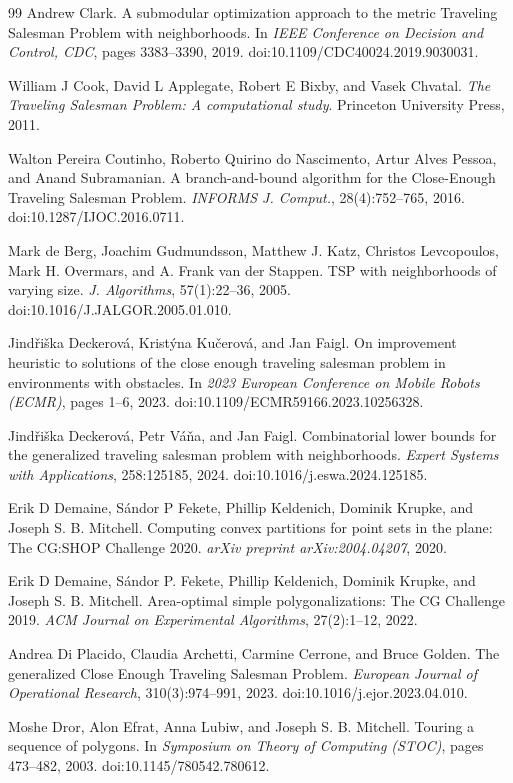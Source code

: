 \documentclass[11pt,a4paper]{article}
\theoremstyle{plain}
\begin{document}
\begin{thebibliography}{99}
 Andrew Clark. A submodular optimization approach to the metric Traveling Salesman Problem with neighborhoods. In \emph{IEEE Conference on Decision and Control, CDC}, pages 3383--3390, 2019. doi:10.1109/CDC40024.2019.9030031.

 William J Cook, David L Applegate, Robert E Bixby, and Vasek Chvatal. \emph{The Traveling Salesman Problem: A computational study}. Princeton University Press, 2011.

 Walton Pereira Coutinho, Roberto Quirino do Nascimento, Artur Alves Pessoa, and Anand Subramanian. A branch-and-bound algorithm for the Close-Enough Traveling Salesman Problem. \emph{INFORMS J. Comput.}, 28(4):752--765, 2016. doi:10.1287/IJOC.2016.0711.

 Mark de Berg, Joachim Gudmundsson, Matthew J. Katz, Christos Levcopoulos, Mark H. Overmars, and A. Frank van der Stappen. TSP with neighborhoods of varying size. \emph{J. Algorithms}, 57(1):22--36, 2005. doi:10.1016/J.JALGOR.2005.01.010.

 Jindřiška Deckerová, Kristýna Kučerová, and Jan Faigl. On improvement heuristic to solutions of the close enough traveling salesman problem in environments with obstacles. In \emph{2023 European Conference on Mobile Robots (ECMR)}, pages 1--6, 2023. doi:10.1109/ECMR59166.2023.10256328.

 Jindřiška Deckerová, Petr Váňa, and Jan Faigl. Combinatorial lower bounds for the generalized traveling salesman problem with neighborhoods. \emph{Expert Systems with Applications}, 258:125185, 2024. doi:10.1016/j.eswa.2024.125185.

 Erik D Demaine, Sándor P Fekete, Phillip Keldenich, Dominik Krupke, and Joseph S. B. Mitchell. Computing convex partitions for point sets in the plane: The CG:SHOP Challenge 2020. \emph{arXiv preprint arXiv:2004.04207}, 2020.

 Erik D Demaine, Sándor P. Fekete, Phillip Keldenich, Dominik Krupke, and Joseph S. B. Mitchell. Area-optimal simple polygonalizations: The CG Challenge 2019. \emph{ACM Journal on Experimental Algorithms}, 27(2):1--12, 2022.

 Andrea Di Placido, Claudia Archetti, Carmine Cerrone, and Bruce Golden. The generalized Close Enough Traveling Salesman Problem. \emph{European Journal of Operational Research}, 310(3):974--991, 2023. doi:10.1016/j.ejor.2023.04.010.

 Moshe Dror, Alon Efrat, Anna Lubiw, and Joseph S. B. Mitchell. Touring a sequence of polygons. In \emph{Symposium on Theory of Computing (STOC)}, pages 473--482, 2003. doi:10.1145/780542.780612.


\end{thebibliography}
\end{document}
